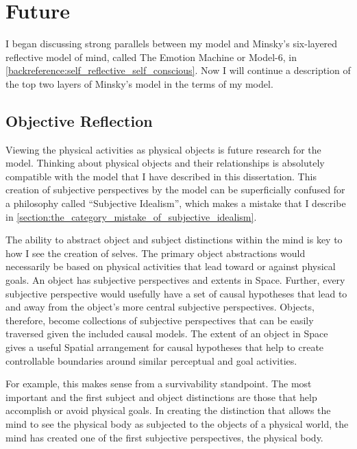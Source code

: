 \chapter{Future}\label{chapter:future}

\label{section:model_6_future_research}

I began discussing strong parallels between my model and Minsky's
six-layered reflective model of mind, called The Emotion Machine or
Model-6, in \autoref{backreference:self_reflective_self_conscious}.
Now I will continue a description of the top two layers of Minsky's
model in the terms of my model.

\section{Objective Reflection}
\label{section:objective_reflection}

Viewing the physical activities as physical objects is future research
for the model.  Thinking about physical objects and their
relationships is absolutely compatible with the model that I have
described in this dissertation.  This creation of subjective
perspectives by the model can be superficially confused for a
philosophy called ``Subjective Idealism'', which makes a mistake that
I describe in
\autoref{section:the_category_mistake_of_subjective_idealism}.

The ability to abstract object and subject distinctions within the
mind is key to how I see the creation of selves.  The primary object
abstractions would necessarily be based on physical activities that
lead toward or against physical goals.  An object has subjective
perspectives and extents in Space.  Further, every subjective
perspective would usefully have a set of causal hypotheses that lead
to and away from the object's more central subjective perspectives.
Objects, therefore, become collections of subjective perspectives that
can be easily traversed given the included causal models.  The extent
of an object in Space gives a useful Spatial arrangement for causal
hypotheses that help to create controllable boundaries around similar
perceptual and goal activities.

For example, this makes sense from a survivability standpoint.  The
most important and the first subject and object distinctions are those
that help accomplish or avoid physical goals.  In creating the
distinction that allows the mind to see the physical body as subjected
to the objects of a physical world, the mind has created one of the
first subjective perspectives, the physical body.

